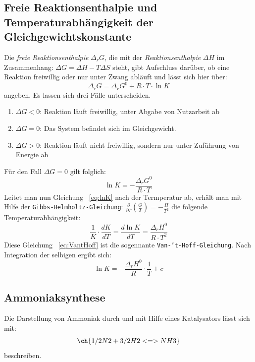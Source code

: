 \documentclass{scrartcl}
\begin{document}
\subsection{Freie Reaktionsenthalpie und Temperaturabhängigkeit der Gleichgewichtskonstante}
Die \emph{freie Reaktionsenthalpie} $\Delta_r G$, die mit der \emph{Reaktionsenthalpie} $\Delta H$ im Zusammenhang: $\Delta G = \Delta H - T\Delta S$ steht, gibt Aufschluss darüber, ob eine Reaktion freiwillig oder nur unter Zwang abläuft und lässt sich hier über:
\begin{equation}
	\Delta_r G = \Delta_rG^0 + R\cdot T\cdot\ln{K}
\end{equation}
angeben. Es lassen sich drei Fälle unterscheiden.
\begin{enumerate}
	\item $\Delta G < 0$: Reaktion läuft freiwillig, unter Abgabe von Nutzarbeit ab
	\item $\Delta G = 0$: Das System befindet sich im Gleichgewicht.
	\item $\Delta G > 0$: Reaktion läuft nicht freiwillig, sondern nur unter Zuführung von Energie ab
\end{enumerate}
Für den Fall $\Delta G = 0$ gilt folglich:
\begin{equation}\label{eq:lnK}
	\ln{K} = -\frac{\Delta_r G^0}{R\cdot T} 
\end{equation}
Leitet man nun Gleichung ~\ref{eq:lnK} nach der Termperatur ab, erhält man mit Hilfe der \texttt{Gibbs-Helmholtz-Gleichung}:
	$	\frac{\partial}{\partial T}(\frac{G}{T}) = -\frac{H}{T^2} \label{eq:Gibbs-Helmholtz}$
	die folgende Temperaturabhängigkeit:
	\begin{equation}
		\frac{1}{K}\cdot \frac{dK}{dT} = \frac{d\ln{K}}{dT} = \frac{\Delta_r H^0}{R\cdot T^2} \label{eq:VantHoff}
\end{equation}
Diese Gleichung ~\ref{eq:VantHoff} ist die sogennante \texttt{Van-’t-Hoff-Gleichung}. Nach Integration der selbigen ergibt sich:
\begin{equation}\label{eq:lnK2}
	\ln{K} = -\frac{\Delta_r H^0}{R}\cdot\frac{1}{T} + c
\end{equation}
\subsection{Ammoniaksynthese}
Die Darstellung von Ammoniak durch  und  mit Hilfe eines Katalysators lässt sich mit:
\begin{equation}
	\ch{1/2 N2 + 3/2 H2 <=>  NH3}
\end{equation}
beschreiben. 
\end{document}

